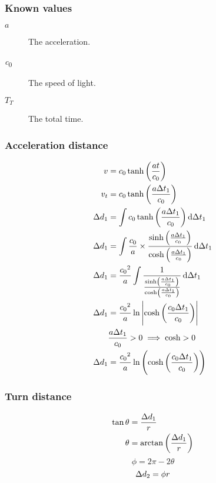 		\subsubsection{Known values}
			\begin{description}
				\item[$a$] The acceleration.
				\item[\si{\clight}] The speed of light.
				\item[$T_T$] The total time.
			\end{description}
		\begin{samepagecols}{2}
			\subsubsection{Acceleration distance}
			\begin{align*}
				v &= \si{\clight}\tanh\left(\frac{at}{\si{\clight}}\right)\\
				v_t &= \si{\clight}\tanh\left(\frac{a \Del t_1}{\si{\clight}}\right)\\
				\Del d_1 &= \int \si{\clight}\tanh\left(\frac{a \Del t_1}{\si{\clight}}\right) \dif \Del t_1\\
				\Del d_1 &= \int \frac{\si{\clight}}{a} \times \frac{\sinh\left(\frac{a \Del t_1}{\si{\clight}}\right)}{\cosh\left(\frac{a \Del t_1}{\si{\clight}}\right)} \dif \Del t_1\\
				\Del d_1 &= \frac{\si{\clight}^2}{a} \int \frac{1}{\frac{\sinh\left(\frac{a \Del t_1}{\si{\clight}}\right)}{\cosh\left(\frac{a \Del t_1}{\si{\clight}}\right)}} \dif \Del t_1\\
				\Del d_1 &= \frac{\si{\clight}^2}{a} \ln\left| \cosh\left(\frac{\si{\clight} \Del t_1}{\si{\clight}}\right)\right|\\
				&\frac{a \Del t_1}{\si{\clight}} > 0 \implies \cosh > 0\\
				\Del d_1 &= \frac{\si{\clight}^2}{a} \ln\left(\cosh\left(\frac{\si{\clight} \Del t_1}{\si{\clight}}\right)\right)
			\end{align*}
			\columnbreak
			\subsubsection{Turn distance}
				\begin{align*}
					\tan \theta &= \frac{\mathrm{\Delta} d_1}{r}\\
					\theta &= \arctan\left(\frac{\mathrm{\Delta} d_1}{r}\right)
				\end{align*}
				\begin{equation*}
					\phi = 2\pi - 2\theta
				\end{equation*}
				\begin{equation*}
					\mathrm{\Delta} d_2 = \phi r
				\end{equation*}

\end{samepagecols}
